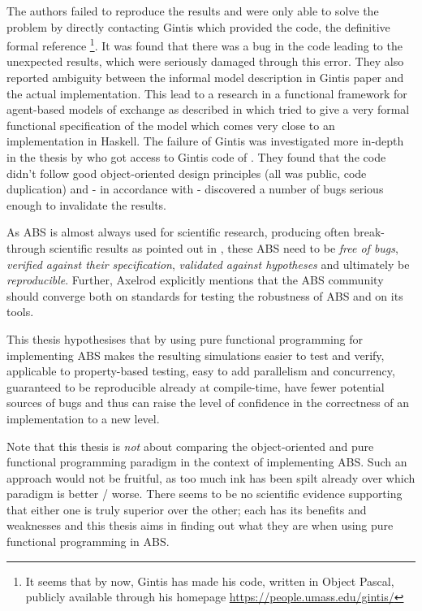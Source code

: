 The authors \cite{ionescu_dependently-typed_2012} failed to reproduce the results and were only able to solve the problem by directly contacting Gintis which provided the code, the definitive formal reference \footnote{It seems that by now, Gintis has made his code, written in Object Pascal, publicly available through his homepage \url{https://people.umass.edu/gintis/}}. It was found that there was a bug in the code leading to the unexpected results, which were seriously damaged through this error. They also reported ambiguity between the informal model description in Gintis paper and the actual implementation.
This lead to a research in a functional framework for agent-based models of exchange as described in \cite{botta_functional_2011} which tried to give a very formal functional specification of the model which comes very close to an implementation in Haskell. The failure of Gintis was investigated more in-depth in the thesis by \cite{evensen_extensible_2010} who got access to Gintis code of \cite{gintis_emergence_2006}. They found that the code didn't follow good object-oriented design principles (all was public, code duplication) and - in accordance with \cite{ionescu_dependently-typed_2012} - discovered a number of bugs serious enough to invalidate the results. 

As ABS is almost always used for scientific research, producing often break-through scientific results as pointed out in \cite{axelrod_chapter_2006}, these ABS need to be \textit{free of bugs}, \textit{verified against their specification}, \textit{validated against hypotheses} and ultimately be \textit{reproducible}. Further, Axelrod explicitly mentions that the ABS community should converge both on standards for testing the robustness of ABS and on its tools.

\bigskip

This thesis hypothesises that by using pure functional programming for implementing ABS makes the resulting simulations easier to test and verify, applicable to property-based testing, easy to add parallelism and concurrency, guaranteed to be reproducible already at compile-time, have fewer potential sources of bugs and thus can raise the level of confidence in the correctness of an implementation to a new level.

\medskip

Note that this thesis is \textit{not} about comparing the object-oriented and pure functional programming paradigm in the context of implementing ABS. Such an approach would not be fruitful, as too much ink has been spilt already over which paradigm is better / worse. There seems to be no scientific evidence supporting that either one is truly superior over the other; each has its benefits and weaknesses and this thesis aims in finding out what they are when using pure functional programming in ABS.

